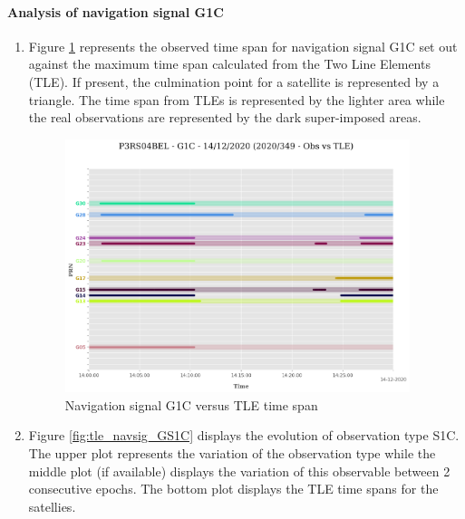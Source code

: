 \paragraph{Analysis of navigation signal G1C}%
\label{para:AnalysisofnavigationsignalG1C}%
\newpage%
\begin{enumerate}%
\item%
Figure \ref{fig:tle_navsig_1CG} represents the observed time span for navigation signal G1C set out against the maximum time span calculated from the  Two Line Elements (TLE). If present, the culmination point for a satellite is represented by a triangle. The time span from TLEs is represented by the lighter area while the real observations are represented by the dark super-imposed areas.%


\begin{figure}[H]%
\centering%
\includegraphics[width=0.95\textwidth]{png/P3RS04BEL_R_20203490000_01D_00U_MO_G-G1C-TLE-arcs.png}%
\caption{\label{fig:tle_navsig_1CG} Navigation signal G1C versus TLE time span}%
\end{figure}

%
\item%
Figure \ref{fig:tle_navsig_GS1C} displays the evolution of observation type S1C. \newline The upper plot represents the variation of the observation type while the middle plot (if available) displays the variation of this observable between 2 consecutive epochs. The bottom plot displays the TLE time spans for the satellies.%



\end{enumerate}
